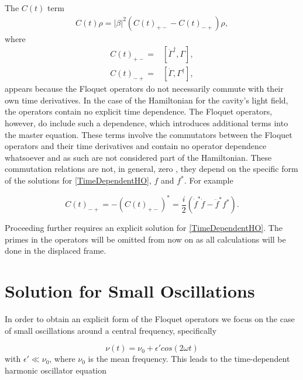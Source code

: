 \documentclass[reprint, amsmath,amssymb, aps,pra]{revtex4-1}
\begin{document}
The $C(t)$ term
 \begin{align}
C(t)\rho = |\beta|^2(C(t)_{+-} - C(t)_{-+})\rho \nonumber,
 \end{align}
 where
\begin{align*}
C(t)_{+-} =& [\dot{\Gamma}^{\dagger}, \Gamma],\\
C(t)_{-+} =& [\dot{\Gamma}, \Gamma^{\dagger}],
\end{align*}
appears because the Floquet operators do not necessarily commute with
their own time derivatives. In the case of the Hamiltonian for the
cavity's light field, the operators contain no explicit time
dependence. The Floquet operators, however,
do include such a dependence, which introduces additional terms into
the master equation. These terms involve the commutators between the
Floquet operators and their time derivatives and contain no operator
dependence whatsoever and as such are not considered part of the
Hamiltonian. These commutation relations are not, in general, zero
\cite{TesisMaestria}, they depend on the specific form of the
solutions for \eqref{TimeDependentHO}, $f$ and $f^*$. For example

\begin{equation}
C(t)_{-+} = -(C(t)_{+-})^* = \frac{i}{2}(\dot{f}^* \dot{f} - \ddot{f}^*f^*).
\end{equation}



Proceeding further requires an explicit solution for
\eqref{TimeDependentHO}. The primes in the operators will be omitted
from now on as all calculations will be done in the displaced frame.


\section{Solution for Small Oscillations}\label{SolSmallOsc}
 
In order to obtain an explicit form of the Floquet operators we focus
on the case of small oscillations around a central frequency,
specifically

\begin{equation}
\nu(t) = \nu_0 + \epsilon' cos(2\omega t)
\end{equation}
with $\epsilon' \ll \nu_0$, where $\nu_0$ is the mean frequency. This
leads to the time-dependent harmonic oscillator equation
\end{document}
